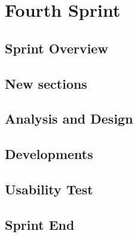 \chapter{Fourth Sprint}
\section{Sprint Overview}


\section{New sections}


\section{Analysis and Design}


\section{Developments}\label{sec:sprint4:developments}


\section{Usability Test}


\section{Sprint End}
